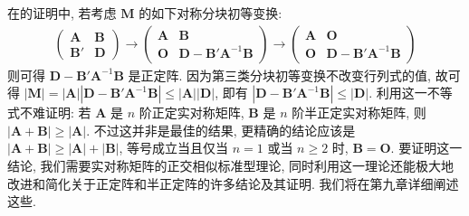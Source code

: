 \documentclass[../../main.tex]{subfiles}
\begin{document}
\begin{remark}
在的证明中, 若考虑 \(\boldsymbol{M}\) 的如下对称分块初等变换:
\begin{align*}
\begin{pmatrix}\boldsymbol{A}&\boldsymbol{B}\\\boldsymbol{B}'&\boldsymbol{D}\end{pmatrix}\to\begin{pmatrix}\boldsymbol{A}&\boldsymbol{B}\\\boldsymbol{O}&\boldsymbol{D}-\boldsymbol{B}'\boldsymbol{A}^{-1}\boldsymbol{B}\end{pmatrix}\to\begin{pmatrix}\boldsymbol{A}&\boldsymbol{O}\\\boldsymbol{O}&\boldsymbol{D}-\boldsymbol{B}'\boldsymbol{A}^{-1}\boldsymbol{B}\end{pmatrix}
\end{align*}
则可得 \(\boldsymbol{D}-\boldsymbol{B}'\boldsymbol{A}^{-1}\boldsymbol{B}\) 是正定阵. 因为第三类分块初等变换不改变行列式的值, 故可得 \(|\boldsymbol{M}|=|\boldsymbol{A}||\boldsymbol{D}-\boldsymbol{B}'\boldsymbol{A}^{-1}\boldsymbol{B}|\leqslant |\boldsymbol{A}||\boldsymbol{D}|\), 即有 \(|\boldsymbol{D}-\boldsymbol{B}'\boldsymbol{A}^{-1}\boldsymbol{B}|\leqslant |\boldsymbol{D}|\). 利用这一不等式不难证明: 若 \(\boldsymbol{A}\) 是 \(n\) 阶正定实对称矩阵, \(\boldsymbol{B}\) 是 \(n\) 阶半正定实对称矩阵, 则 \(|\boldsymbol{A}+\boldsymbol{B}|\geqslant |\boldsymbol{A}|\). 不过这并非是最佳的结果, 更精确的结论应该是 \(|\boldsymbol{A}+\boldsymbol{B}|\geqslant |\boldsymbol{A}|+|\boldsymbol{B}|\), 等号成立当且仅当 \(n = 1\) 或当 \(n\geqslant 2\) 时, \(\boldsymbol{B}=\boldsymbol{O}\). 要证明这一结论, 我们需要实对称矩阵的正交相似标准型理论, 同时利用这一理论还能极大地改进和简化关于正定阵和半正定阵的许多结论及其证明. 我们将在第九章详细阐述这些.
\end{remark}
\end{document}
